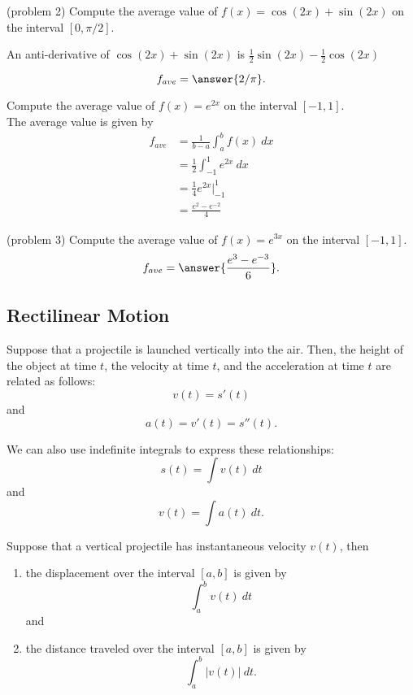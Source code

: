 \documentclass{ximera}
\begin{document}
\begin{problem}(problem 2)
Compute the average value of $f(x) = \cos(2x) + \sin(2x)$ on the interval $[0,\pi/2]$.
\begin{hint}
An anti-derivative of $\cos(2x) + \sin(2x)$ is  $\tfrac12\sin(2x) - \tfrac12\cos(2x)$
\end{hint}
\[f_{ave} = \answer{2/\pi}.\]
\end{problem} 



\begin{example}[example 3]
Compute the average value of $f(x) = e^{2x}$ on the interval $[-1,1]$.\\
The average value is given by 
\begin{align*}
f_{ave} &= \frac{1}{b-a}\int_a^b f(x) \ dx \\
 & = \frac12\int_{-1}^1 e^{2x} \ dx \\
 & = \frac14 e^{2x} \Bigg|_{-1}^1 \\
  & = \frac{e^2 - e^{-2}}{4}
\end{align*}
\end{example}



\begin{problem}(problem 3)
Compute the average value of $f(x) = e^{3x}$ on the interval $[-1,1]$.
\[f_{ave} = \answer{\frac{e^{3} - e^{-3}}{6}}.\]
\end{problem} 




\subsection{Rectilinear Motion}

Suppose that a projectile is launched vertically into the air.
Then, the height of the object at time $t$, the velocity at time $t$, and the acceleration at time $t$ are related as follows:
\[v(t) = s'(t)\]
and
\[a(t) = v'(t) = s''(t).\]

We can also use indefinite integrals to express these relationships:
\[s(t) = \int v(t) \ dt\]
and
\[v(t) = \int a(t) \ dt.\]


\begin{proposition}
Suppose that a vertical projectile has instantaneous velocity $v(t)$, then
\begin{enumerate}
\item the displacement over the interval $[a,b]$ is given by 
\[\int_a^b v(t) \ dt\]
and
\item the distance traveled over the interval $[a,b]$ is given by 
\[\int_a^b |v(t)| \ dt.\]
\end{enumerate}
\end{proposition}
\end{document}
